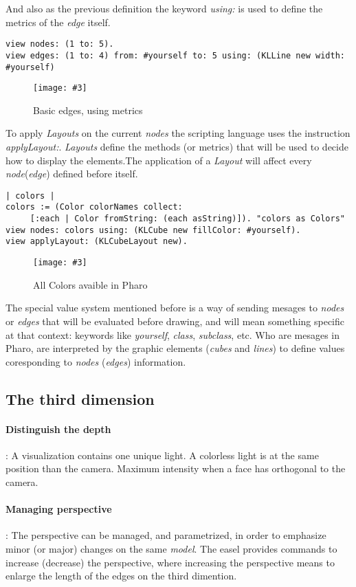 \documentclass[runningheads]{llncs}
\newcommand{\fig}[4]{
	\begin{figure}[#1]
		\centering
		\texttt{[image: \#3]}
		\caption{\label{fig:#3}#4}
	\end{figure}}
\newcommand{\seclabel}[1]{\label{sec:#1}}
\begin{document}
And also as the previous definition the keyword \emph{using:} is used
to define the metrics of the \emph{edge} itself.  
\begin{lstlisting}
view nodes: (1 to: 5).	
view edges: (1 to: 4) from: #yourself to: 5 using: (KLLine new width: #yourself)
\end{lstlisting}
\fig{}{0.5}{figure5.png}{Basic edges, using metrics}

To apply \emph{Layouts} on the current \emph{nodes} the scripting
language uses the instruction \emph{applyLayout:}. \emph{Layouts}
define the methods (or metrics) that will be used to decide how
to display the elements.The application of a \emph{Layout} will 
affect every \emph{node}(\emph{edge}) defined before itself.
\begin{lstlisting}
| colors |
colors := (Color colorNames collect: 
	 [:each | Color fromString: (each asString)]). "colors as Colors"
view nodes: colors using: (KLCube new fillColor: #yourself).
view applyLayout: (KLCubeLayout new).
\end{lstlisting}
\fig{}{0.3}{figure6.png}{All Colors avaible in Pharo}
 
The special value system mentioned before is a way of sending
mesages to \emph{nodes} or \emph{edges} that will be evaluated
before drawing, and will mean something specific at that context:
keywords like \emph{yourself}, \emph{class}, \emph{subclass}, etc.
Who are mesages in Pharo, are interpreted by the graphic
elements (\emph{cubes} and \emph{lines}) to define values
coresponding to \emph{nodes} (\emph{edges}) information. 
\subsection{The third dimension} \seclabel{3d}

\paragraph{Distinguish the depth}: 
A visualization contains one unique light. 
A colorless light is at the same position than the camera. 
Maximum intensity when a face has orthogonal to the camera.

\paragraph{Managing perspective}: 
The perspective can be managed, and parametrized,
in order to emphasize minor (or major) changes on the same
\emph{model}. The easel provides commands to increase 
(decrease) the perspective, where increasing the
perspective means to enlarge the length of the edges on the
third dimention. 
\end{document}
